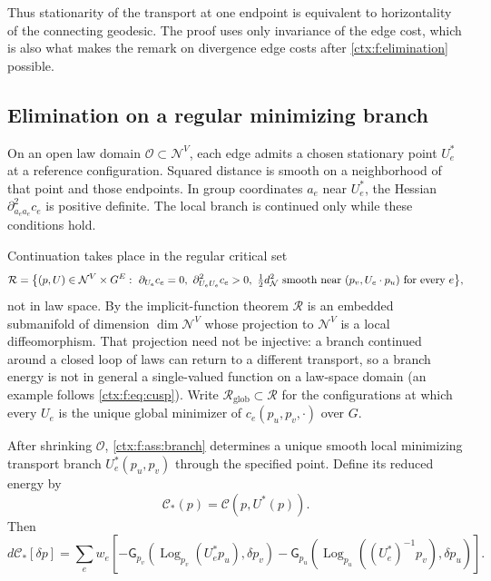 Thus stationarity of the transport at one endpoint is equivalent to horizontality of the connecting geodesic. The proof uses only invariance of the edge cost, which is also what makes the remark on divergence edge costs after \cref{ctx:f:elimination} possible.

\subsection{Elimination on a regular minimizing branch}

On an open law domain $\mathcal O\subset\mathcal N^V$, each edge admits a chosen stationary point $U_e^*$ at a reference configuration. Squared distance is smooth on a neighborhood of that point and those endpoints. In group coordinates $a_e$ near $U_e^*$, the Hessian $\partial^2_{a_ea_e}c_e$ is positive definite. The local branch is continued only while these conditions hold.

Continuation takes place in the regular critical set
\begin{equation}
 \mathcal R=\bigl\{(p,U)\in\mathcal N^V\times G^E:\ \partial_{U_e}c_e=0,\ \partial^2_{U_eU_e}c_e>0,\ \tfrac12d_{\mathcal N}^2\hbox{ smooth near }(p_v,U_e\cdot p_u)\hbox{ for every }e\bigr\},
 \label{ctx:f:eq:regular-set}
\end{equation}
not in law space. By the implicit-function theorem $\mathcal R$ is an embedded submanifold of dimension $\dim\mathcal N^V$ whose projection to $\mathcal N^V$ is a local diffeomorphism. That projection need not be injective: a branch continued around a closed loop of laws can return to a different transport, so a branch energy is not in general a single-valued function on a law-space domain (an example follows \cref{ctx:f:eq:cusp}). Write $\mathcal R_{\mathrm{glob}}\subset\mathcal R$ for the configurations at which every $U_e$ is the unique global minimizer of $c_e(p_u,p_v,\cdot)$ over $G$.


After shrinking $\mathcal O$, \cref{ctx:f:ass:branch} determines a unique smooth local minimizing transport branch $U_e^*(p_u,p_v)$ through the specified point. Define its reduced energy by
\begin{equation}
 \mathcal C_*(p)=\mathcal C(p,U^*(p)).
\end{equation}
Then
\begin{equation}
 d\mathcal C_*[\delta p]
 =\sum_e w_e\left[
  -\mathsf G_{p_v}(\operatorname{Log}_{p_v}(U_e^*p_u),\delta p_v)
  -\mathsf G_{p_u}(\operatorname{Log}_{p_u}((U_e^*)^{-1}p_v),\delta p_u)
 \right].
 \label{ctx:f:eq:envelope}
\end{equation}

